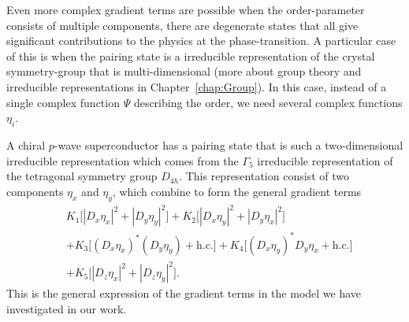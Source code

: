 Even more complex gradient terms are possible when the order-parameter consists of multiple components, \ie there are degenerate
states that all give significant contributions to the physics at the phase-transition. A particular case of this is when the
pairing state is a irreducible representation of the crystal symmetry-group that is multi-dimensional (more about group theory
and irreducible representations in Chapter~\ref{chap:Group}). In this case, instead of a single complex function $\Psi$
describing the order, we need several complex functions $\eta_i$. 

A chiral $p$-wave superconductor has a pairing state that
is such a two-dimensional irreducible representation which comes from the $\Gamma_5$ irreducible representation of the
tetragonal symmetry group $D_{4h}$. This representation consist of two components $\eta_x$ and $\eta_y$, which combine
to form the general gradient terms
\begin{equation}
    \label{eq:statMech:gradTerms:chiralPWave}
    \begin{split}
        &K_1\big[|D_x\eta_x|^2 + |D_y\eta_y|^2\big] + K_2\big[|D_x\eta_y|^2 + |D_y\eta_x|^2\big]\\
        & + K_3\big[(D_x\eta_x)^\ast(D_y\eta_y) + \text{h.c.}\big] + K_4\big[(D_x\eta_y)^\ast D_y\eta_x + \text{h.c.}\big]\\
        & + K_5\big[|D_z\eta_x|^2 + |D_z\eta_y|^2\big].
    \end{split}
\end{equation}
This is the general expression of the gradient terms in the model we have investigated in our work.
